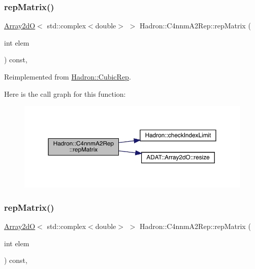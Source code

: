 \subsubsection{\texorpdfstring{repMatrix()}{repMatrix()}\hspace{0.1cm}{\footnotesize\ttfamily [1/2]}}
{\footnotesize\ttfamily \mbox{\hyperlink{classADAT_1_1Array2dO}{Array2dO}}$<$ std\+::complex$<$double$>$ $>$ Hadron\+::\+C4nnm\+A2\+Rep\+::rep\+Matrix (\begin{DoxyParamCaption}\item[{int}]{elem }\end{DoxyParamCaption}) const\hspace{0.3cm}{\ttfamily [inline]}, {\ttfamily [virtual]}}



Reimplemented from \mbox{\hyperlink{structHadron_1_1CubicRep_ac5d7e9e6f4ab1158b5fce3e4ad9e8005}{Hadron\+::\+Cubic\+Rep}}.

Here is the call graph for this function\+:
\nopagebreak
\begin{figure}[H]
\begin{center}
\leavevmode
\includegraphics[width=350pt]{d6/d9a/structHadron_1_1C4nnmA2Rep_a7c58333a62449bb9badf449950b1828b_cgraph}
\end{center}
\end{figure}
\mbox{\label{structHadron_1_1C4nnmA2Rep_a7c58333a62449bb9badf449950b1828b}} 
\subsubsection{\texorpdfstring{repMatrix()}{repMatrix()}\hspace{0.1cm}{\footnotesize\ttfamily [2/2]}}
{\footnotesize\ttfamily \mbox{\hyperlink{classADAT_1_1Array2dO}{Array2dO}}$<$ std\+::complex$<$double$>$ $>$ Hadron\+::\+C4nnm\+A2\+Rep\+::rep\+Matrix (\begin{DoxyParamCaption}\item[{int}]{elem }\end{DoxyParamCaption}) const\hspace{0.3cm}{\ttfamily [inline]}, {\ttfamily [virtual]}}



